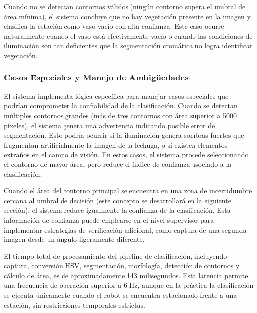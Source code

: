 Cuando no se detectan contornos válidos (ningún contorno supera el umbral de área mínima), el sistema concluye que no hay vegetación presente en la imagen y clasifica la estación como vaso vacío con alta confianza. Este caso ocurre naturalmente cuando el vaso está efectivamente vacío o cuando las condiciones de iluminación son tan deficientes que la segmentación cromática no logra identificar vegetación.

\subsubsection{Casos Especiales y Manejo de Ambigüedades}

El sistema implementa lógica específica para manejar casos especiales que podrían comprometer la confiabilidad de la clasificación. Cuando se detectan múltiples contornos grandes (más de tres contornos con área superior a 5000 píxeles), el sistema genera una advertencia indicando posible error de segmentación. Esto podría ocurrir si la iluminación genera sombras fuertes que fragmentan artificialmente la imagen de la lechuga, o si existen elementos extraños en el campo de visión. En estos casos, el sistema procede seleccionando el contorno de mayor área, pero reduce el índice de confianza asociado a la clasificación.

Cuando el área del contorno principal se encuentra en una zona de incertidumbre cercana al umbral de decisión (este concepto se desarrollará en la siguiente sección), el sistema reduce igualmente la confianza de la clasificación. Esta información de confianza puede emplearse en el nivel supervisor para implementar estrategias de verificación adicional, como captura de una segunda imagen desde un ángulo ligeramente diferente.

El tiempo total de procesamiento del pipeline de clasificación, incluyendo captura, conversión HSV, segmentación, morfología, detección de contornos y cálculo de área, es de aproximadamente 143 milisegundos. Esta latencia permite una frecuencia de operación superior a 6 Hz, aunque en la práctica la clasificación se ejecuta únicamente cuando el robot se encuentra estacionado frente a una estación, sin restricciones temporales estrictas.

